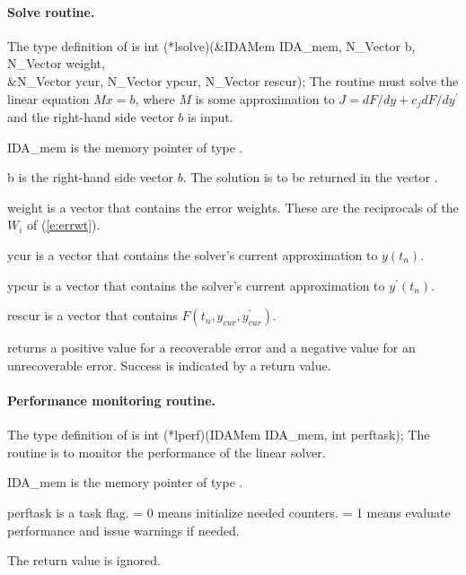 \paragraph{Solve routine.}
The type definition of  is
{
  int (*lsolve)(&IDAMem IDA\_mem, N\_Vector b, N\_Vector weight, \\
                &N\_Vector ycur, N\_Vector ypcur, N\_Vector rescur);  
}
{
  The routine  must solve the linear equation $M x = b$, where         
  $M$ is some approximation to $J = dF/dy + c_j dF/dy^\prime$  
  and the right-hand side vector $b$ is input. 
}
{
  \begin{args}
  \item[IDA\_mem]
    is the {\ida} memory pointer of type .
  \item[b]
    is the right-hand side vector $b$. The solution is to be    
    returned in the vector .
  \item[weight]
    is a vector that contains the error weights.
    These are the reciprocals of the $W_i$ of (\ref{e:errwt}).
  \item[ycur]
    is a vector that contains the solver's current approximation to $y(t_n)$.
  \item[ypcur]
    is a vector that contains the solver's current approximation to $y^\prime(t_n)$.
  \item[rescur]
    is a vector that contains $F(t_n,y_{cur},y_{cur}^\prime)$. 
  \end{args}
}
{
   returns a positive value    
  for a recoverable error and a negative value for an             
  unrecoverable error. Success is indicated by a  return value.
}
{}


\paragraph{Performance monitoring routine.}
The type definition of  is
{
  int (*lperf)(IDAMem IDA\_mem, int perftask);
}
{
  The routine  is to monitor the performance of the linear solver.
}
{
  \begin{args}
  \item[IDA\_mem]
    is the {\ida} memory pointer of type .
  \item[perftask]
    is a task flag.   = 0 means initialize needed counters.
     = 1 means evaluate performance and issue warnings if needed.
  \end{args}
}
{
  The  return value is ignored.
}
{}

